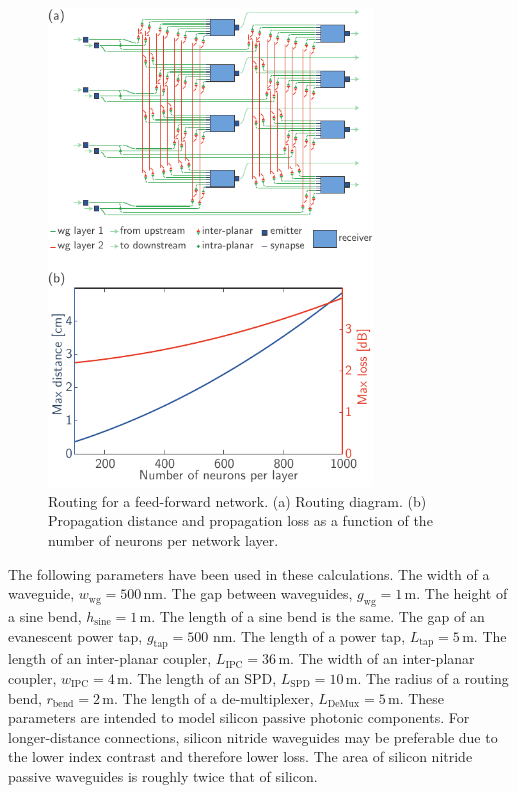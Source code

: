 \documentclass[twocolumn]{article}
\begin{document}
\begin{figure}[t!]
	\centerline{\includegraphics[width=8.6cm]{_networks_feedForward_small.pdf}}
	\caption{\label{fig:networks_feedForward}Routing for a feed-forward network. (a) Routing diagram. (b) Propagation distance and propagation loss as a function of the number of neurons per network layer.}
\end{figure}
The following parameters have been used in these calculations. The width of a waveguide, $w_{\mathrm{wg}} = 500$\,nm. The gap between waveguides, $g_{\mathrm{wg}} = 1$\,\textmu m. The height of a sine bend, $h_{\mathrm{sine}} = 1$\,\textmu m. The length of a sine bend is the same. The gap of an evanescent power tap, $g_{\mathrm{tap}}= 500$ nm. The length of a power tap, $L_{\mathrm{tap}} = 5$\,\textmu m. The length of an inter-planar coupler, $L_{\mathrm{IPC}} = 36$\,\textmu m. The width of an inter-planar coupler, $w_{\mathrm{IPC}} = 4$\,\textmu m. The length of an SPD, $L_{\mathrm{SPD}} = 10$\,\textmu m. The radius of a routing bend, $r_{\mathrm{bend}} = 2$\,\textmu m. The length of a de-multiplexer, $L_{\mathrm{DeMux}} = 5$\,\textmu m.
These parameters are intended to model silicon passive photonic components. For longer-distance connections, silicon nitride waveguides may be preferable due to the lower index contrast and therefore lower loss. The area of silicon nitride passive waveguides is roughly twice that of silicon.  
\end{document}
